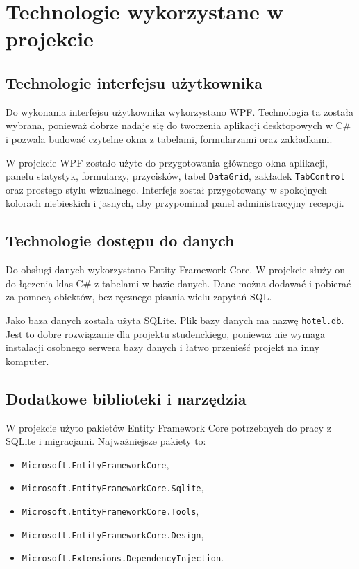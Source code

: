 \chapter{Technologie wykorzystane w projekcie}

\section{Technologie interfejsu użytkownika}

Do wykonania interfejsu użytkownika wykorzystano WPF. Technologia ta została wybrana, ponieważ dobrze nadaje się do tworzenia aplikacji desktopowych w C\# i pozwala budować czytelne okna z tabelami, formularzami oraz zakładkami.

W projekcie WPF zostało użyte do przygotowania głównego okna aplikacji, panelu statystyk, formularzy, przycisków, tabel \texttt{DataGrid}, zakładek \texttt{TabControl} oraz prostego stylu wizualnego. Interfejs został przygotowany w spokojnych kolorach niebieskich i jasnych, aby przypominał panel administracyjny recepcji.

\section{Technologie dostępu do danych}

Do obsługi danych wykorzystano Entity Framework Core. W projekcie służy on do łączenia klas C\# z tabelami w bazie danych. Dane można dodawać i pobierać za pomocą obiektów, bez ręcznego pisania wielu zapytań SQL.

Jako baza danych została użyta SQLite. Plik bazy danych ma nazwę \texttt{hotel.db}. Jest to dobre rozwiązanie dla projektu studenckiego, ponieważ nie wymaga instalacji osobnego serwera bazy danych i łatwo przenieść projekt na inny komputer.

\section{Dodatkowe biblioteki i narzędzia}

W projekcie użyto pakietów Entity Framework Core potrzebnych do pracy z SQLite i migracjami. Najważniejsze pakiety to:

\begin{itemize}
  \item \texttt{Microsoft.EntityFrameworkCore},
  \item \texttt{Microsoft.EntityFrameworkCore.Sqlite},
  \item \texttt{Microsoft.EntityFrameworkCore.Tools},
  \item \texttt{Microsoft.EntityFrameworkCore.Design},
  \item \texttt{Microsoft.Extensions.DependencyInjection}.
\end{itemize}


